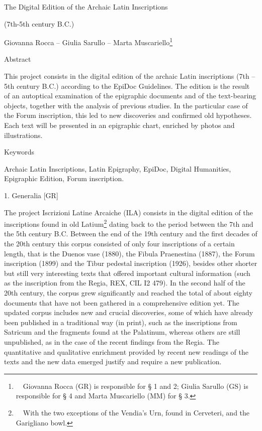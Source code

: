 \documentclass[amsthm,ebook]{saparticle}
\date{2015-09-18}
\begin{document}
The Digital Edition of the Archaic Latin Inscriptions 

(7th{}-5th century B.C.)

Giovanna Rocca – Giulia Sarullo – Marta Muscariello\footnote{\par \ \ Giovanna Rocca (GR) is responsible for § 1 and 2;
Giulia Sarullo (GS) is responsible for § 4 and Marta Muscariello (MM) for § 3.}

Abstract

This project consists in the digital edition of the archaic Latin inscriptions (7th – 5th century B.C.) according to the
EpiDoc Guidelines. The edition is the result of an autoptical examination of the epigraphic documents and of the
text-bearing objects, together with the analysis of previous studies. In the particular case of the Forum inscription,
this led to new discoveries and confirmed old hypotheses. Each text will be presented in an epigraphic chart, enriched
by photos and illustrations.


\bigskip

Keywords

Archaic Latin Inscriptions, Latin Epigraphy, EpiDoc, Digital Humanities, Epigraphic Edition, Forum inscription. 


\bigskip


\bigskip

1. Generalia [GR]

The project Iscrizioni Latine Arcaiche (ILA) consists in the digital edition of the inscriptions found in old
Latium\footnote{\par \ \  With the two exceptions of the Vendia’s Urn, found in Cerveteri, and the Garigliano bowl.}
dating back to the period between the 7th and the 5th century B.C. Between the end of the 19th century and the first
decades of the 20th century this corpus consisted of only four inscriptions of a certain length, that is the Duenos
vase (1880), the Fibula Praenestina (1887), the Forum inscription (1899) and the Tibur pedestal inscription (1926),
besides other shorter but still very interesting texts that offered important cultural information (such as the
inscription from the Regia, REX, CIL I2 479). In the second half of the 20th century, the corpus grew significantly and
reached the total of about eighty documents that have not been gathered in a comprehensive edition yet. The updated
corpus includes new and crucial discoveries, some of which have already been published in a traditional way (in print),
such as the inscriptions from Satricum and the fragments found at the Palatinum, whereas others are still unpublished,
as in the case of the recent findings from the Regia. The quantitative and qualitative enrichment provided by recent
new readings of the texts and the new data emerged justify and require a new publication. 
\end{document}
